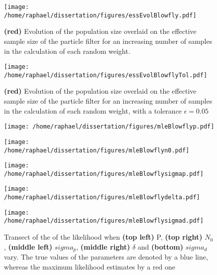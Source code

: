 \documentclass[12pt]{article}
\begin{document}
	\begin{figure}[htb]
		\centering
		\begin{minipage}{0.9\textwidth}
			\centering
			\texttt{[image: /home/raphael/dissertation/figures/essEvolBlowfly.pdf]}
		\end{minipage}
		\caption[Evolution of the ESS, Nicholson's blowfly model]{\textbf{(red)} Evolution of the population size overlaid on the effective sample size of the particle filter for an increasing number of samples in the calculation of each random weight.}
		\label{fig:essBlow}
	\end{figure}

	\begin{figure}[htb]
		\centering
		\begin{minipage}{0.9\textwidth}
			\centering
			\texttt{[image: /home/raphael/dissertation/figures/essEvolBlowflyTol.pdf]}
		\end{minipage}
		\caption[Evolution of the ESS using a fixed tolerance equal to 0.05, Nicholson's blowfly model]{\textbf{(red)} Evolution of the population size overlaid on the effective sample size of the particle filter for an increasing number of samples in the calculation of each random weight, with a tolerance $\epsilon=0.05$}
		\label{fig:essBlowTol}
	\end{figure}
	
	\begin{figure}[htb]
		\centering
		\begin{minipage}{0.49\textwidth}
			\centering
			\texttt{[image: /home/raphael/dissertation/figures/mleBlowflyp.pdf]}
		\end{minipage}
		\begin{minipage}{0.49\textwidth}
			\centering
			\texttt{[image: /home/raphael/dissertation/figures/mleBlowflyn0.pdf]}
		\end{minipage}
		\begin{minipage}{0.49\textwidth}
			\centering
			\texttt{[image: /home/raphael/dissertation/figures/mleBlowflysigmap.pdf]}
		\end{minipage}
		\begin{minipage}{0.49\textwidth}
			\centering
			\texttt{[image: /home/raphael/dissertation/figures/mleBlowflydelta.pdf]}
		\end{minipage}
		\begin{minipage}{0.49\textwidth}
			\centering
			\texttt{[image: /home/raphael/dissertation/figures/mleBlowflysigmad.pdf]}
		\end{minipage}
		\caption[Transect of the log-likelihood with respect to each of the parameters of Nicholson's blowfly model]{Transect of the of the likelihood when \textbf{(top left)} P, \textbf{(top right)} $N_0$,  \textbf{(middle left)} $sigma_p$, \textbf{(middle right)} $\delta$ and \textbf{(bottom)} $sigma_d$ vary. The true values of the parameters are denoted by a blue line, whereas the maximum likelihood estimates by a red one}
		\label{fig:transectBlow}
	\end{figure}
	
\end{document}
